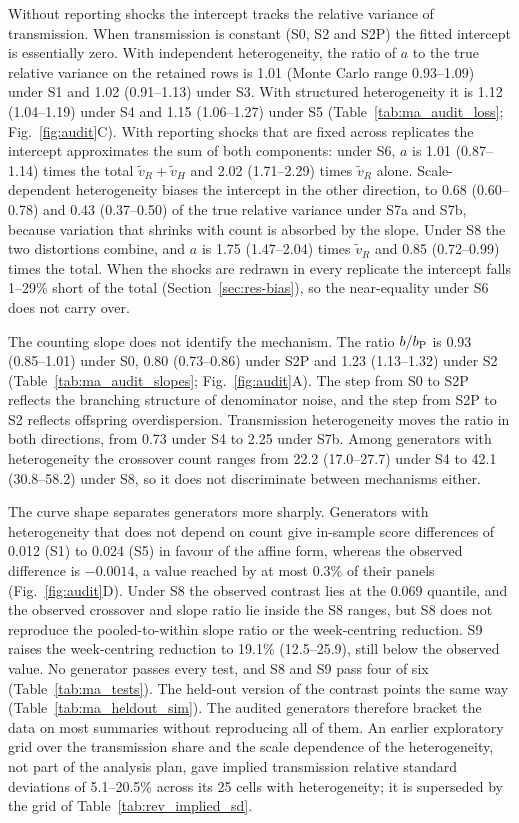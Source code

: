 Without reporting shocks the intercept tracks the relative variance of transmission. When transmission is constant (S0, S2 and S2P) the fitted intercept is essentially zero. With independent heterogeneity, the ratio of $a$ to the true relative variance on the retained rows is 1.01 (Monte Carlo range 0.93--1.09) under S1 and 1.02 (0.91--1.13) under S3. With structured heterogeneity it is 1.12 (1.04--1.19) under S4 and 1.15 (1.06--1.27) under S5 (Table~\ref{tab:ma_audit_loss}; Fig.~\ref{fig:audit}C). With reporting shocks that are fixed across replicates the intercept approximates the sum of both components: under S6, $a$ is 1.01 (0.87--1.14) times the total $\tilde v_R+\tilde v_H$ and 2.02 (1.71--2.29) times $\tilde v_R$ alone. Scale-dependent heterogeneity biases the intercept in the other direction, to 0.68 (0.60--0.78) and 0.43 (0.37--0.50) of the true relative variance under S7a and S7b, because variation that shrinks with count is absorbed by the slope. Under S8 the two distortions combine, and $a$ is 1.75 (1.47--2.04) times $\tilde v_R$ and 0.85 (0.72--0.99) times the total. When the shocks are redrawn in every replicate the intercept falls 1--29\% short of the total (Section~\ref{sec:res-bias}), so the near-equality under S6 does not carry over.

The counting slope does not identify the mechanism. The ratio $b/b_{\mathrm P}$ is 0.93 (0.85--1.01) under S0, 0.80 (0.73--0.86) under S2P and 1.23 (1.13--1.32) under S2 (Table~\ref{tab:ma_audit_slopes}; Fig.~\ref{fig:audit}A). The step from S0 to S2P reflects the branching structure of denominator noise, and the step from S2P to S2 reflects offspring overdispersion. Transmission heterogeneity moves the ratio in both directions, from 0.73 under S4 to 2.25 under S7b. Among generators with heterogeneity the crossover count ranges from 22.2 (17.0--27.7) under S4 to 42.1 (30.8--58.2) under S8, so it does not discriminate between mechanisms either.

The curve shape separates generators more sharply. Generators with heterogeneity that does not depend on count give in-sample score differences of 0.012 (S1) to 0.024 (S5) in favour of the affine form, whereas the observed difference is $-0.0014$, a value reached by at most 0.3\% of their panels (Fig.~\ref{fig:audit}D). Under S8 the observed contrast lies at the 0.069 quantile, and the observed crossover and slope ratio lie inside the S8 ranges, but S8 does not reproduce the pooled-to-within slope ratio or the week-centring reduction. S9 raises the week-centring reduction to 19.1\% (12.5--25.9), still below the observed value. No generator passes every test, and S8 and S9 pass four of six (Table~\ref{tab:ma_tests}). The held-out version of the contrast points the same way (Table~\ref{tab:ma_heldout_sim}). The audited generators therefore bracket the data on most summaries without reproducing all of them. An earlier exploratory grid over the transmission share and the scale dependence of the heterogeneity, not part of the analysis plan, gave implied transmission relative standard deviations of 5.1--20.5\% across its 25 cells with heterogeneity; it is superseded by the grid of Table~\ref{tab:rev_implied_sd}.

